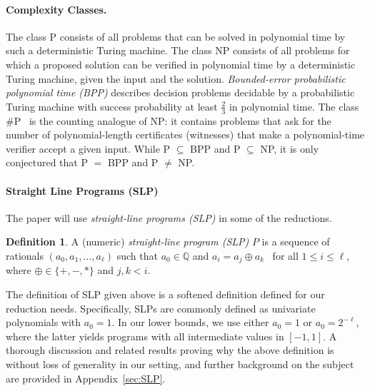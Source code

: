 \documentclass{article}
\newcommand{\Q}{\mathbb{Q}}
\theoremstyle{plain}
\theoremstyle{definition}
\newtheorem{definition}[theorem]{Definition}
\theoremstyle{remark}
\begin{document}
\paragraph{Complexity Classes.} 
The class $\mathrm{P}$ consists of all problems that can be solved in polynomial time by such a deterministic Turing machine. The class $\mathrm{NP}$ consists of all problems for which a proposed solution can be verified in polynomial time by a deterministic Turing machine, given the input and the solution. 
{\em Bounded-error probabilistic polynomial time (BPP)} describes decision problems decidable by a probabilistic Turing machine with success probability at least $\frac{2}{3}$ in polynomial time. The class $\#\mathrm{P}$~\cite{valiant1979complexity} is the counting analogue of $\mathrm{NP}$: it contains problems that ask for the number of polynomial-length certificates (witnesses) that make a polynomial-time verifier accept a given input.
While P $\subseteq$ BPP and P $\subseteq$ NP, it is only conjectured that P $=$ BPP and P $\neq$ NP. 


\paragraph{Straight Line Programs (SLP)}
The paper will use {\em straight-line programs (SLP)} in some of the reductions. 

\begin{definition}
    \label{def:SLP_p}
	A (numeric) {\em straight-line program (SLP)} $P$ is a sequence of rationals $(a_0, a_1, \ldots , a_{\ell})$ such
	that $a_0 \in \Q$ and $a_i = a_j \oplus a_k$~ for all $1 \leq i \leq \ell$, where $\oplus \in \{+, -, *\}$ and $j, k < i$. 
\end{definition} 

The definition of SLP given above is a softened definition defined for our reduction needs. Specifically, SLPs are commonly defined as univariate polynomials with $a_0 = 1$. In our lower bounds, we use either $a_0 = 1$ or $a_0 = 2^{-\ell}$, where the latter yields programs with all intermediate values in $[-1,1]$.  
A thorough discussion and related results proving why the above definition is without loss of generality in our setting, and further background on the subject are provided in Appendix~\ref{sec:SLP}. 
\end{document}
